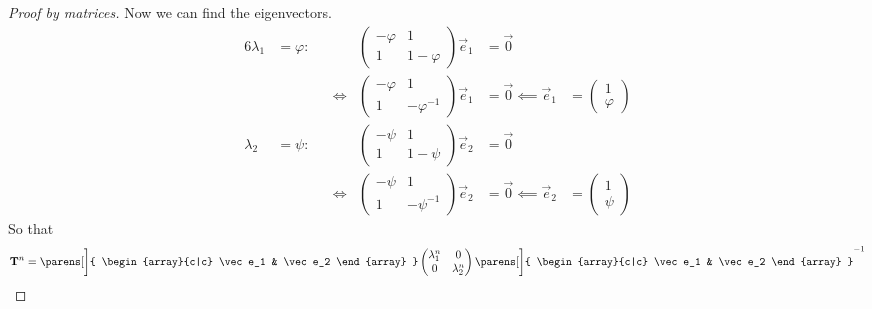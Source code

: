 \begin{proof}[Proof by matrices]
    Now we can find the eigenvectors.
    \begin{alignat*}6
        \lambda_1 &= \varphi:&
        &&
        \begin{pmatrix}
            -\varphi & 1 \\
            1 & 1 - \varphi
        \end{pmatrix} \vec e_1 &= \vec 0 \\
        && &\iff{}&
        \begin{pmatrix}
            -\varphi & 1 \\
            1 & -\varphi^{-1}
        \end{pmatrix} \vec e_1 &= \vec 0 \impliedby \vec e_1 &{}=
            \begin{pmatrix}
                1 \\
                \varphi
            \end{pmatrix} \\
        \lambda_2 &= \psi:&
        &&
        \begin{pmatrix}
            -\psi & 1 \\
            1 & 1 - \psi
        \end{pmatrix} \vec e_2 &= \vec 0 \\
        && &\iff{}&
        \begin{pmatrix}
            -\psi & 1 \\
            1 & -\psi^{-1}
        \end{pmatrix} \vec e_2 &= \vec 0 \impliedby \vec e_2 &{}=
            \begin{pmatrix}
                1 \\
                \psi
            \end{pmatrix}
    \end{alignat*}
    So that
    \begin{align*}
        \mat T^n &=
        \parens[\bigg]{
            \begin{array}{c|c}
                \vec e_1 & \vec e_2
            \end{array}
        }
        \begin{pmatrix}
            \lambda_1^n & 0 \\
            0 & \lambda_2^n
        \end{pmatrix}
        \parens[\bigg]{
            \begin{array}{c|c}
                \vec e_1 & \vec e_2
            \end{array}
        }^{-1} \\

\end{align*}
\end{proof}

